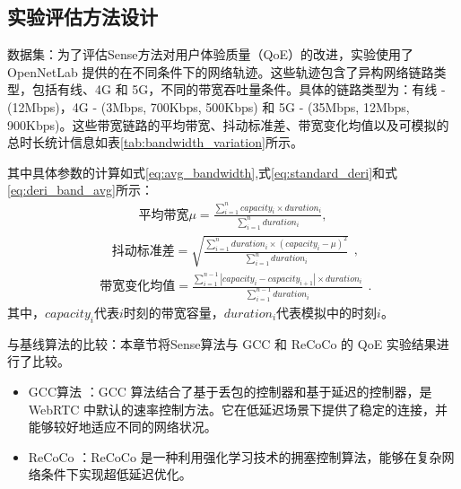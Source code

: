 \subsection{实验评估方法设计}
数据集：为了评估Sense方法对用户体验质量（QoE）的改进，实验使用了 OpenNetLab 提供的在不同条件下的网络轨迹。这些轨迹包含了异构网络链路类型，包括有线、4G 和 5G，不同的带宽吞吐量条件。具体的链路类型为：有线 - (12Mbps)，4G - (3Mbps, 700Kbps, 500Kbps) 和 5G - (35Mbps, 12Mbps, 900Kbps)。这些带宽链路的平均带宽、抖动标准差、带宽变化均值以及可模拟的总时长统计信息如表\ref{tab:bandwidth_variation}所示。


其中具体参数的计算如式\eqref{eq:avg_bandwidth},式\eqref{eq:standard_deri}和式\eqref{eq:deri_band_avg}所示：
\begin{equation}
\begin{aligned}
\text{平均带宽} \mu = \frac{\sum_{i=1}^{n} capacity_i \times duration_i}{\sum_{i=1}^{n} duration_i},
\end{aligned}
\label{eq:avg_bandwidth}
\end{equation}
\begin{equation}
\begin{aligned}
\text{抖动标准差} = \sqrt{\frac{\sum_{i=1}^{n} duration_i \times (capacity_i - \mu)^2}{\sum_{i=1}^{n} duration_i}}
\end{aligned},
\label{eq:standard_deri}
\end{equation}
\begin{equation}
\begin{aligned}
\text{带宽变化均值} = \frac{\sum_{i=1}^{n-1} |capacity_i - capacity_{i+1}| \times duration_i}{\sum_{i=1}^{n-1} duration_i}
\end{aligned}.
\label{eq:deri_band_avg}
\end{equation}
其中，$capacity_i$代表$i$时刻的带宽容量，$duration_i$代表模拟中的时刻$i$。

与基线算法的比较：本章节将Sense算法与 GCC 和 ReCoCo 的 QoE 实验结果进行了比较。

\begin{itemize}
    \item GCC算法 \cite{carlucci2016analysis}：GCC 算法结合了基于丢包的控制器和基于延迟的控制器，是 WebRTC 中默认的速率控制方法。它在低延迟场景下提供了稳定的连接，并能够较好地适应不同的网络状况。
    
    \item ReCoCo \cite{markudova2023recoco}：ReCoCo 是一种利用强化学习技术的拥塞控制算法，能够在复杂网络条件下实现超低延迟优化。
\end{itemize}


